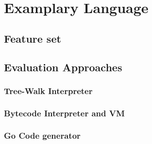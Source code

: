 \chapter{Examplary Language}

\section{Feature set}

\section{Evaluation Approaches}

\subsection{Tree-Walk Interpreter}
\subsection{Bytecode Interpreter and VM}
\subsection{Go Code generator}

